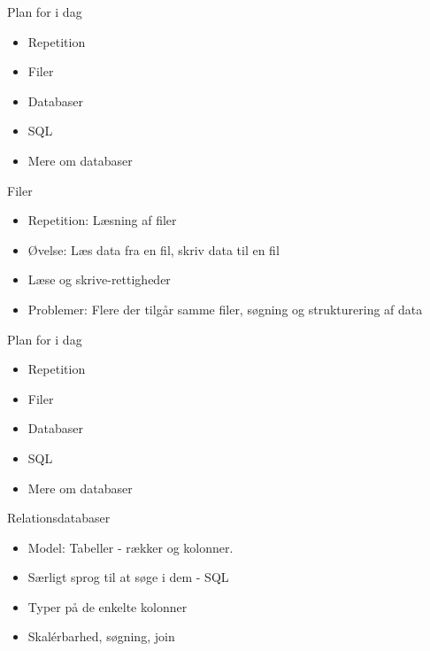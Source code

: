 \documentclass[a4paper,landscape]{slides}
\begin{document}
\begin{slide}
	\begin{center} {\large 
            Plan for i dag
	} \end{center}
	\begin{itemize} \addtolength{\itemsep}{-\baselineskip}
		\item Repetition
		\item Filer
		\item Databaser
		\item SQL
		\item Mere om databaser
	\end{itemize}
\end{slide}

\begin{slide}
	\begin{center} {\large 
            Filer
	} \end{center}
	\begin{itemize} \addtolength{\itemsep}{-\baselineskip}
		\item Repetition: Læsning af filer
		\item Øvelse: Læs data fra en fil, skriv data til en fil
		\item Læse og skrive-rettigheder
		\item Problemer: Flere der tilgår samme filer, søgning og strukturering af data
	\end{itemize}
\end{slide}


\begin{slide}
	\begin{center} {\large 
            Plan for i dag
	} \end{center}
	\begin{itemize} \addtolength{\itemsep}{-\baselineskip}
		\item Repetition
		\item Filer
		\item Databaser
		\item SQL
		\item Mere om databaser
	\end{itemize}
\end{slide}

\begin{slide}
	\begin{center} {\large 
            Relationsdatabaser
	} \end{center}
	\begin{itemize} \addtolength{\itemsep}{-\baselineskip}
		\item Model: Tabeller - rækker og kolonner.
		\item Særligt sprog til at søge i dem - SQL
                \item Typer på de enkelte kolonner
		\item Skalérbarhed, søgning, join
	\end{itemize}
\end{slide}
\end{document}
